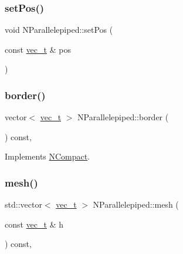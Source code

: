 \subsubsection{\texorpdfstring{setPos()}{setPos()}}
{\footnotesize\ttfamily void N\+Parallelepiped\+::set\+Pos (\begin{DoxyParamCaption}\item[{const \mbox{\hyperlink{group___n_algebra_ga0a2cfc67e738a3d73e4f12098c4c07f6}{vec\+\_\+t}} \&}]{pos }\end{DoxyParamCaption})}

\mbox{\label{class_n_parallelepiped_a6cc531927e40a95b48923b56406206d3}} 
\subsubsection{\texorpdfstring{border()}{border()}}
{\footnotesize\ttfamily vector$<$ \mbox{\hyperlink{group___n_algebra_ga0a2cfc67e738a3d73e4f12098c4c07f6}{vec\+\_\+t}} $>$ N\+Parallelepiped\+::border (\begin{DoxyParamCaption}{ }\end{DoxyParamCaption}) const\hspace{0.3cm}{\ttfamily [override]}, {\ttfamily [virtual]}}



Implements \mbox{\hyperlink{class_n_compact_af7acc50099e80fc13ce32c97e6857308}{N\+Compact}}.

\mbox{\label{class_n_parallelepiped_a0f9ba9f6cab5d2c9472776e69f9aa78d}} 
\subsubsection{\texorpdfstring{mesh()}{mesh()}}
{\footnotesize\ttfamily std\+::vector$<$ \mbox{\hyperlink{group___n_algebra_ga0a2cfc67e738a3d73e4f12098c4c07f6}{vec\+\_\+t}} $>$ N\+Parallelepiped\+::mesh (\begin{DoxyParamCaption}\item[{const \mbox{\hyperlink{group___n_algebra_ga0a2cfc67e738a3d73e4f12098c4c07f6}{vec\+\_\+t}} \&}]{h }\end{DoxyParamCaption}) const\hspace{0.3cm}{\ttfamily [override]}, {\ttfamily [virtual]}}



